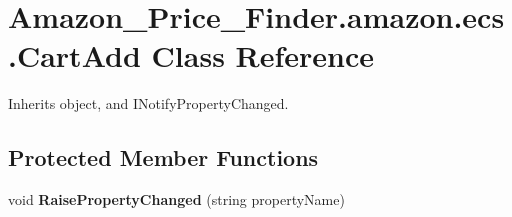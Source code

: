 \hypertarget{class_amazon___price___finder_1_1amazon_1_1ecs_1_1_cart_add}{\section{Amazon\-\_\-\-Price\-\_\-\-Finder.\-amazon.\-ecs.\-Cart\-Add Class Reference}
\label{class_amazon___price___finder_1_1amazon_1_1ecs_1_1_cart_add}
}


 




Inherits object, and I\-Notify\-Property\-Changed.

\subsection*{Protected Member Functions}
\begin{DoxyCompactItemize}
\item 
\hypertarget{class_amazon___price___finder_1_1amazon_1_1ecs_1_1_cart_add_ac76ab8f7bd9a0a98ba3bacd3adebd4d0}{void {\bfseries Raise\-Property\-Changed} (string property\-Name)}\label{class_amazon___price___finder_1_1amazon_1_1ecs_1_1_cart_add_ac76ab8f7bd9a0a98ba3bacd3adebd4d0}

\end{DoxyCompactItemize}
